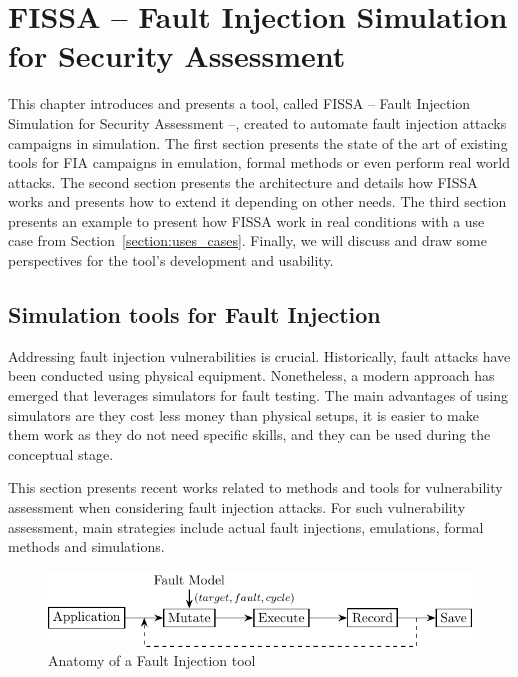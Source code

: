 \chapter{FISSA -- Fault Injection Simulation for Security Assessment}
\label{chapter:fissa}
\minitoc

This chapter introduces and presents a tool, called FISSA -- Fault Injection Simulation for Security Assessment --, created to automate fault injection attacks campaigns in simulation. 
The first section presents the state of the art of existing tools for FIA campaigns in emulation, formal methods or even perform real world attacks.
The second section presents the architecture and details how FISSA works and presents how to extend it depending on other needs.
The third section presents an example to present how FISSA work in real conditions with a use case from Section~\ref{section:uses_cases}.
Finally, we will discuss and draw some perspectives for the tool's development and usability.

\section{Simulation tools for Fault Injection}

Addressing fault injection vulnerabilities is crucial. Historically, fault attacks have been conducted using physical equipment. Nonetheless, a modern approach has emerged that leverages simulators for fault testing. The main advantages of using simulators are they cost less money than physical setups, it is easier to make them work as they do not need specific skills, and they can be used during the conceptual stage.

This section presents recent works related to methods and tools for vulnerability assessment when considering fault injection attacks. For such vulnerability assessment, main strategies include actual fault injections, emulations, formal methods and simulations.

\begin{figure}[ht]
    \centering
    \includegraphics{c4_fissa/img/fissa/anatomy.pdf}
    \caption{Anatomy of a Fault Injection tool}
    \label{fig:anatomy_tool}
\end{figure}

